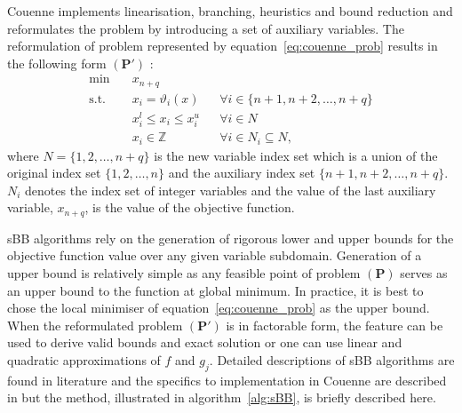 Couenne implements linearisation, branching, heuristics and bound reduction and reformulates the problem by introducing a set of auxiliary variables. The reformulation of problem represented by equation~\eqref{eq:couenne_prob} results in the following form $(\mathbf{P'})$ \cite{Belotti:2009aa}: 
\begin{equation} \label{eq:couenne_reform}
\begin{aligned}
	\min \quad &x_{n+q}			& \\
	\text{s.t.} \quad &x_i = \vartheta_i \left(x \right)  	& &\forall i \in \{{n+1}, {n+2}, \dots, {n+q} \} \\
	&x_i^l \leq x_i \leq x_i^u	& &\forall i \in N \\
	& x_i \in \mathbb{Z}		& &\forall i \in N_i \subseteq N,
\end{aligned}
\end{equation}
where $N = \{{1}, {2}, \dots, {n+q} \}$ is the new variable index set which is a union of the original index set $\{{1}, {2}, \dots, {n} \}$ and the auxiliary index set $\{{n+1}, {n+2}, \dots, {n+q} \}$. $N_i$ denotes the index set of integer variables and the value of the last auxiliary variable, $x_{n+q}$, is the value of the objective function.

sBB algorithms rely on the generation of rigorous lower and upper bounds for the objective function value over any given variable subdomain. Generation of a upper bound is relatively simple as any feasible point of problem $(\mathbf{P})$ serves as an upper bound to the function at global minimum. In practice, it is best to chose the local minimiser of equation~\eqref{eq:couenne_prob} as the upper bound. When the reformulated problem $(\mathbf{P'})$ is in factorable form, the feature can be used to derive valid bounds and exact solution or one can use linear and quadratic approximations of $f$ and $g_j$. Detailed descriptions of sBB algorithms are found in literature \cite{Smith:1999aa,Liberti:2006aa} and the specifics to implementation in Couenne are described in \cite{Belotti:2009aa} but the method, illustrated in algorithm~\ref{alg:sBB}, is briefly described here. 
	
